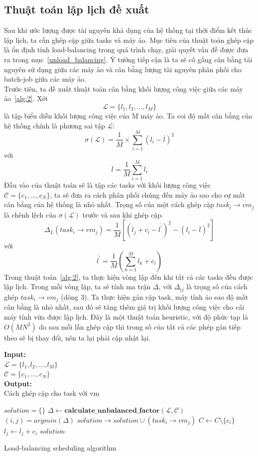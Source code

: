 \documentclass{my_style}
\begin{document}
\subsection{Thuật toán lập lịch đề xuất}
\label{proposed_algo}
Sau khi ước lượng được tài nguyên khả dụng của hệ thống tại thời điểm kết thúc lập lịch, ta cần ghép cặp giữa tasks và máy ảo. Mục tiêu của thuật toán ghép cặp là ổn định tính load-balancing trong quá trình chạy, giải quyết vấn đề được đưa ra trong mục~\ref{unload_balancing}. Ý tưởng tiếp cận là ta sẽ cố gắng cân bằng tài nguyên sử dụng giữa các máy ảo và cân bằng lượng tài nguyên phân phối cho batch-job giữa các máy ảo.\\
Trước tiên, ta đề xuất thuật toán cân bằng khối lượng công việc giữa các máy ảo~\ref{alg:2}. Xét 
\[
	\mathcal{L} = \{l_{1}, l_{2}, ..., l_{M}\}
\]
là tập biểu diễn khối lượng công việc của M máy ảo. Ta coi độ mất cân bằng của hệ thống chính là phương sai tập $\mathcal{L}$: 
\[
	\sigma(\mathcal{L}) = \frac{1}{M} \times \sum_{i = 1}^{M}(l_{i} - \overline{l})^{2}
\]
với 
\[
	\overline{l} = \frac{1}{M}\sum_{i = 1}^{M}l_{i}
\]
Đầu vào của thuật toán sẽ là tập các tasks với khối lượng công việc $\mathcal{C} = \{c_{1}, ..., c_{N}\}$, ta sẽ đưa ra cách phân phối chúng đến máy ảo sao cho sự mất cân bằng của hệ thống là nhỏ nhất. Trọng số của một cách ghép cặp $task_{i} \rightarrow vm_{j}$ là chênh lệch của $\sigma(\mathcal{L})$ trước và sau khi ghép cặp.
\[
	\Delta_{L}(task_{i} \rightarrow vm_{j}) = \frac{1}{M}[(l_{j} + c_{i} - \overline{l^{'}})^{2} - (l_{i} - \overline{l})^{2}]
\]
với 
\[
	\overline{l^{'}} = \frac{1}{M}(\sum_{k = 1}^{M}l_{k} + c_{i})
\]
Trong thuật toán~\ref{alg:2}, ta thực hiện vòng lập đến khi tất cả các tasks đều được lập lịch. Trong mỗi vòng lặp, ta sẽ tính ma trận $\Delta$, với $\Delta_{ij}$ là trọng số của cách ghép $task_{i} \rightarrow vm_{j}$ (dòng 3). Ta thực hiện gán cặp task, máy tính ảo sao độ mất cân bằng là nhỏ nhất, sau đó sẽ tăng thêm giá trị khối lượng công việc cho cái máy tính vừa được lập lịch. Đây là một thuật toán heuristic, với độ phức tạp là $O(MN^{2})$ do sau mỗi lần ghép cặp thì trong số của tất cả các phép gán tiếp theo sẽ bị thay đổi, nên ta lại phải cập nhật lại. \\
\begin{algorithm}[H]
\textbf{Input:} \\
$\mathcal{L} = \{l_{1}, l_{2}, ..., l_{M}\}$\\
$\mathcal{C} = \{c_{1}, ..., c_{N}\}$ \\ 
\textbf{Output:} \\
Cách ghép cặp cho task với vm
\begin{algorithmic}[1]
	\STATE $solution = \{\}$
		\STATE $\Delta \leftarrow \textbf{calculate\_unbalanced\_factor}(\mathcal{L}, \mathcal{C})$
		\STATE $(i, j) = argmin(\Delta)$
		\STATE $solution \rightarrow solution \cup (task_{i} \rightarrow vm_{j})$
		\STATE $C \leftarrow C \setminus \{c_{i}\}$
		\STATE $l_{j} \leftarrow l_{j} + c_{i}$
	\ENDWHILE
	\RETURN $solution$
\end{algorithmic}
\caption{Load-balancing scheduling algorithm}
\label{alg:2}
\end{algorithm}
\end{document}
